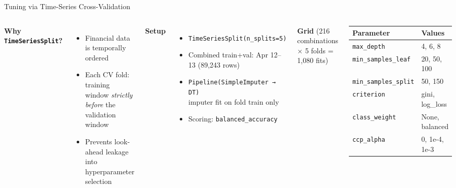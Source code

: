 \documentclass[aspectratio=169,10pt]{beamer}
\newcommand{\code}[1]{\texttt{\small #1}}
\begin{document}
\begin{frame}{Tuning via Time-Series Cross-Validation}
  \begin{columns}[T]
    \textbf{Why \code{TimeSeriesSplit}?}
    \begin{itemize}
      \item Financial data is temporally ordered
      \item Each CV fold: training window \emph{strictly before} the validation window
      \item Prevents look-ahead leakage into hyperparameter selection
    \end{itemize}

    \medskip

    \textbf{Setup}
    \begin{itemize}
      \item \code{TimeSeriesSplit(n\_splits=5)}
      \item Combined train+val: Apr 12–13 (89{,}243 rows)
      \item \code{Pipeline(SimpleImputer → DT)} \\
            imputer fit on fold train only
      \item Scoring: \code{balanced\_accuracy}
    \end{itemize}

    \medskip
    \textbf{Grid} (216 combinations × 5 folds = 1{,}080 fits)
    \begin{center}
    \begin{tabular}{ll}
      \toprule
      Parameter & Values \\
      \midrule
      \code{max\_depth}           & 4, 6, 8 \\
      \code{min\_samples\_leaf}   & 20, 50, 100 \\
      \code{min\_samples\_split}  & 50, 150 \\
      \code{criterion}            & gini, log\_loss \\
      \code{class\_weight}        & None, balanced \\
      \code{ccp\_alpha}           & 0, 1e-4, 1e-3 \\
      \bottomrule
    \end{tabular}
    \end{center}
  \end{columns}
\end{frame}
\end{document}
